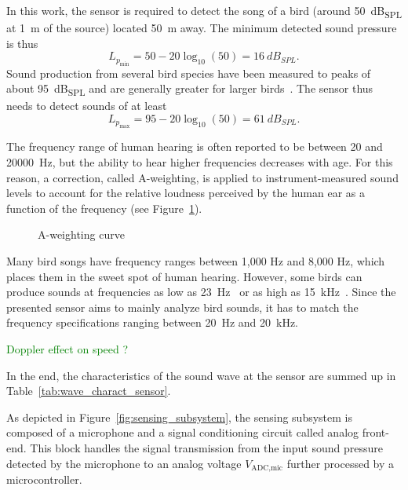 \documentclass{EPL-master-thesis-covers-EN}
\newcommand{\te}[1]{\textrm{#1}}
\begin{document}
In this work, the sensor is required to detect the song of a bird (around \SI{50}{dB_{SPL}} at \SI{1}{m} of the source) located \SI{50}{m} away. The minimum detected sound pressure is thus
\[
 L_{p_\te{min}} = 50 - 20\log_{10}(50) = \SI{16}{dB_{SPL}}.
\]
Sound production from several bird species have been measured to peaks of about \SI{95}{dB_{SPL}} and are generally greater for larger birds~\cite{FHWA}. The sensor thus needs to detect sounds of at least
\[
 L_{p_\te{max}} = 95 - 20\log_{10}(50) = \SI{61}{dB_{SPL}}.
\]

The frequency range of human hearing is often reported to be between 20 and \SI{20000}{Hz}, but the ability to hear higher frequencies decreases with age. For this reason, a correction, called A-weighting, is applied to instrument-measured sound levels to account for the relative loudness perceived by the human ear as a function of the frequency (see Figure~\ref{fig:a_weighting}).

\begin{figure}[H]
    \centering
    
    \caption{A-weighting curve}
    \label{fig:a_weighting}
\end{figure}

Many bird songs have frequency ranges between 1,000 Hz and 8,000 Hz, which places them in the sweet spot of human hearing. However, some birds can produce sounds at frequencies as low as \SI{23}{Hz}~\cite{10.2307/4090277} or as high as \SI{15}{kHz}~\cite{doi:10.1111/j.1474-919X.1962.tb08647.x}. Since the presented sensor aims to mainly analyze bird sounds, it has to match the frequency specifications ranging between \SI{20}{Hz} and \SI{20}{kHz}.

\textcolor{green}{Doppler effect on speed ?}

In the end, the characteristics of the sound wave at the sensor are summed up in Table~\ref{tab:wave_charact_sensor}.

\begin{table}[H]
\centering
{}
\caption{Sound wave characteristics at the sensor}
\label{tab:wave_charact_sensor}
\end{table}


As depicted in Figure~\ref{fig:sensing_subsystem}, the sensing subsystem is composed of a microphone and a signal conditioning circuit called analog front-end. This block handles the signal transmission from the input sound pressure detected by the microphone to an analog voltage $V_{\te{ADC,mic}}$ further processed by a microcontroller.
\end{document}
